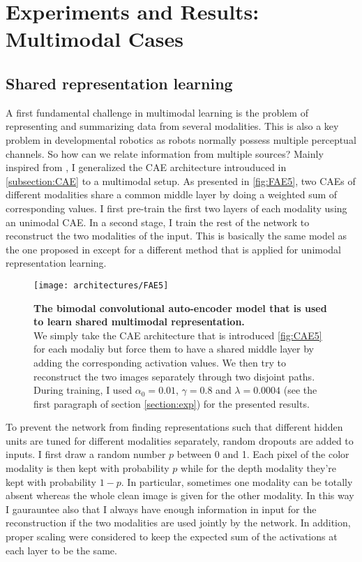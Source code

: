\section{Experiments and Results: Multimodal Cases} \label{section:multi}

\subsection{Shared representation learning} \label{subsection:shared}

A first fundamental challenge in multimodal learning is the problem
of representing and summarizing data from several modalities.
This is also a key problem in developmental robotics as robots
normally possess multiple perceptual channels.
So how can we relate information from multiple sources?
Mainly inspired from \cite{J. Ngiam 2011, A. Droniou 2014},
I generalized the CAE architecture introuduced in \ref{subsection:CAE}
to a multimodal setup. As presented in \autoref{fig:FAE5}, two CAEs
of different modalities share a common middle layer by doing a weighted sum
of corresponding values. I first pre-train the first two layers
of each modality using an unimodal CAE. In a second stage, I train the
rest of the network to reconstruct the two modalities of the input.
This is basically the same model as the one proposed in
\cite{J. Ngiam 2011} except for a different method that is applied for
unimodal representation learning.

\vspace{-0.5em}
\begin{figure}[H]
  \centering
  \texttt{[image: architectures/FAE5]}
  \caption{%
    \textbf{The bimodal convolutional auto-encoder model that is
      used to learn shared multimodal representation.}\\[0.1em]
    We simply take the CAE architecture that is introduced
      \autoref{fig:CAE5} for each modaliy but force them to have a
      shared middle layer by adding the corresponding activation values.
      We then try to reconstruct the two images separately through
      two disjoint paths. During training, I used $\alpha_0=0.01$,
      $\gamma = 0.8$ and $\lambda = 0.0004$ (see the first paragraph
      of section \ref{section:exp}) for the presented results.}
  \label{fig:FAE5}
\end{figure}

To prevent the network from finding representations such that different
hidden units are tuned for different modalities separately, random
dropouts are added to inputs. I first draw a random number $p$ between
0 and 1. Each pixel of the color modality is then kept with probability $p$
while for the depth modality they're kept with probability $1-p$.
In particular, sometimes one modality can be totally absent whereas
the whole clean image is given for the other modality.
In this way I gaurauntee also that I always have enough information
in input for the reconstruction if the two modalities are
used jointly by the network.
In addition, proper scaling were considered to keep the expected
sum of the activations at each layer to be the same.

